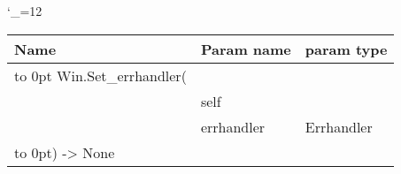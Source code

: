 \begingroup \catcode`\_=12 \tt
\begin{tabular}{lll}
\toprule
\textrm{Name}&\textrm{Param name}&\textrm{param type}\\
\midrule
\hbox to 0pt {Win.Set_errhandler(\hss}\\
& self\\
& errhandler & Errhandler\\
\hbox to 0pt{) -> None\hss}\\
\bottomrule
\end{tabular}
\endgroup
